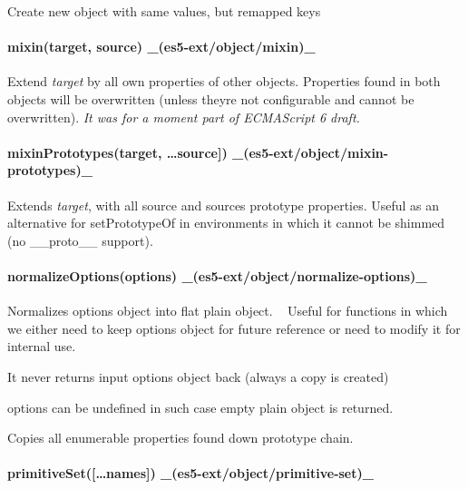 Create new object with same values, but remapped keys

\paragraph*{mixin(target, source) \+\_\+(es5-\/ext/object/mixin)\+\_\+}

Extend {\itshape target} by all own properties of other objects. Properties found in both objects will be overwritten (unless they\textquotesingle{}re not configurable and cannot be overwritten). {\itshape It was for a moment part of E\+C\+M\+A\+Script 6 draft.}

\paragraph*{mixin\+Prototypes(target, …source\mbox{]}) \+\_\+(es5-\/ext/object/mixin-\/prototypes)\+\_\+}

Extends {\itshape target}, with all source and source\textquotesingle{}s prototype properties. Useful as an alternative for {\ttfamily set\+Prototype\+Of} in environments in which it cannot be shimmed (no {\ttfamily \+\_\+\+\_\+proto\+\_\+\+\_\+} support).

\paragraph*{normalize\+Options(options) \+\_\+(es5-\/ext/object/normalize-\/options)\+\_\+}

Normalizes options object into flat plain object. ~\newline
 Useful for functions in which we either need to keep options object for future reference or need to modify it for internal use.


\begin{DoxyItemize}
\item It never returns input {\ttfamily options} object back (always a copy is created)
\item {\ttfamily options} can be undefined in such case empty plain object is returned.
\item Copies all enumerable properties found down prototype chain.
\end{DoxyItemize}

\paragraph*{primitive\+Set(\mbox{[}…names\mbox{]}) \+\_\+(es5-\/ext/object/primitive-\/set)\+\_\+}

